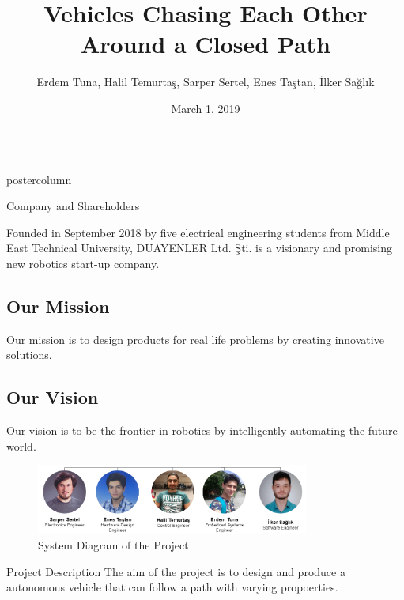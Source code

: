 \documentclass{beamer}
\title{\huge Vehicles Chasing Each Other \\Around a Closed Path}
\author{Erdem Tuna, Halil Temurtaş, Sarper Sertel, Enes Taştan, İlker Sağlık}
\institute[ETH]{\LARGE DUAYENLER Ltd. Şti. 
}
\date{March 1, 2019}
\newlength{\columnheight}
\begin{document}
\begin{frame}
\begin{columns}
	\begin{column}{.5\textwidth}
		\begin{beamercolorbox}[center]{postercolumn}
			\begin{minipage}{.98\textwidth}  %
				\parbox[t][\columnheight]{\textwidth}{ %
					\begin{myblock}{Company and Shareholders}
						
						Founded in September 2018 by five electrical engineering students from Middle East Technical University, DUAYENLER Ltd. Şti. is a visionary and promising new robotics start-up company.
												
						\subsection{Our Mission}
						Our mission is to design products for real life problems by creating innovative solutions.
						
						\subsection{Our Vision}
						Our vision is to be the frontier in robotics by intelligently automating the future world.

			\begin{figure}
				\centering
				\includegraphics[width=0.8\textwidth]{img/company-tree2}
				\caption{System Diagram of the Project}
				\label{fig:overall-system}
				\-\vspace{-2.0cm}
			\end{figure}
					\-\vspace{-1.5cm}
					\end{myblock} %
					\vspace{-0.4em}
					\begin{myblock}{Project Description}
						The aim of the project is to design and produce a autonomous vehicle that can follow a path with varying propoerties.
						

\end{myblock}}
\end{minipage}
\end{beamercolorbox}
\end{column}
\end{columns}
\end{frame}
\end{document}
